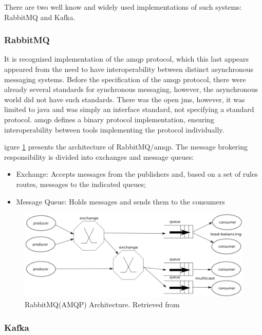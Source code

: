 There are two well know and widely used implementations of such systems: RabbitMQ and Kafka\cite{kafka-vs-rabbitmq}.

\subsubsection{RabbitMQ}

It is recognized implementation of the \gls{amqp} protocol, which this last appears appeared from the need to have interoperability between distinct asynchronous messaging systems.
Before the specification of the \gls{amqp} protocol, there were already several standards for synchronous messaging, however, the asynchronous world did not have such standards.
There was the open \gls{jms}, however, it was limited to java and was simply an interface standard, not specifying a standard protocol.
\gls{amqp} defines a binary protocol implementation, ensuring interoperability between tools implementing the protocol individually.

igure \ref{fig:rabbitmq} presents the architecture of RabbitMQ/\gls{amqp}.
The message brokering responsibility is divided into exchanges and message queues:

\begin{itemize}
    \item Exchange: Accepts messages from the publishers and, based on a set of rules routes, messages to the indicated queues;
    \item Message Queue: Holds messages and sends them to the consumers
\end{itemize}

\begin{figure}[H]
    \center
    \includegraphics[width=.9\textwidth]{rabbitmq}
    \caption{RabbitMQ(AMQP) Architecture. Retrieved from \cite{kafka-vs-rabbitmq}}
    \label{fig:rabbitmq}
\end{figure}

\subsubsection{Kafka}

